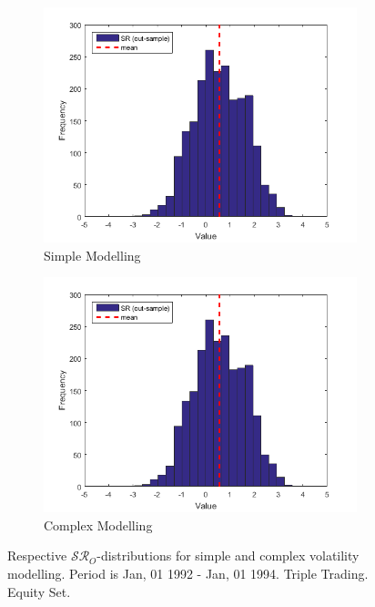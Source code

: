 \documentclass[11pt,a4,twosided,singlespacing,titlepagenumber=on]{scrreprt}
\numberwithin{equation}{chapter} %
\theoremstyle{remark}
\begin{document}
\begin{figure}[H]
    \centering
    \begin{subfigure}[t]{0.49\textwidth}
        \centering
        \includegraphics[width=1\textwidth]{res/params/731_1462/sr}
        \caption{Simple Modelling}
    \end{subfigure}
    \begin{subfigure}[t]{0.49\textwidth}
        \centering
        \includegraphics[width=1\textwidth]{res/params/731_1462/sr}
        \caption{Complex Modelling}
    \end{subfigure}
    \caption[]{Respective $\mathcal{SR}_O$-distributions for simple and complex volatility modelling. Period is Jan, 01 1992 - Jan, 01 1994. Triple Trading. Equity Set.}
    \label{fig:sharpe_ratio_comparison}
\end{figure}
\end{document}
